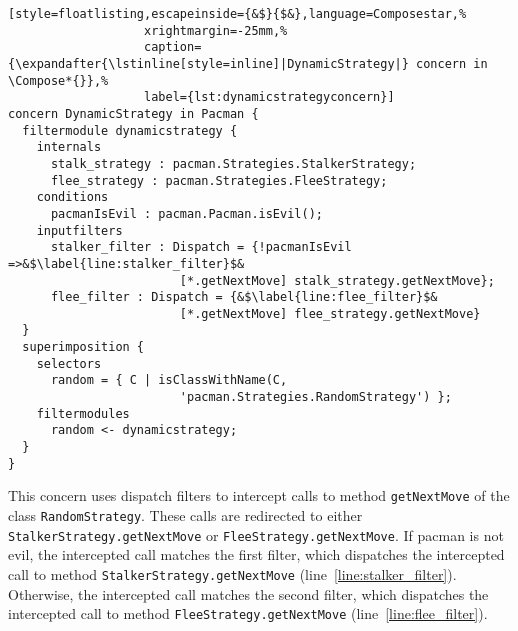 \begin{lstlisting}[style=floatlisting,escapeinside={&$}{$&},language=Composestar,%
                   xrightmargin=-25mm,%
                   caption={\expandafter{\lstinline[style=inline]|DynamicStrategy|} concern in \Compose*{}},%
                   label={lst:dynamicstrategyconcern}]
concern DynamicStrategy in Pacman {
  filtermodule dynamicstrategy {
    internals
      stalk_strategy : pacman.Strategies.StalkerStrategy;
      flee_strategy : pacman.Strategies.FleeStrategy;   
    conditions
      pacmanIsEvil : pacman.Pacman.isEvil();
    inputfilters
      stalker_filter : Dispatch = {!pacmanIsEvil =>&$\label{line:stalker_filter}$&
                        [*.getNextMove] stalk_strategy.getNextMove};
      flee_filter : Dispatch = {&$\label{line:flee_filter}$&
                        [*.getNextMove] flee_strategy.getNextMove}
  }
  superimposition {
    selectors
      random = { C | isClassWithName(C,
                        'pacman.Strategies.RandomStrategy') };
    filtermodules
      random <- dynamicstrategy;
  }
}
\end{lstlisting}

This concern uses dispatch filters to intercept calls to method \lstinline|getNextMove| of the class \lstinline|RandomStrategy|.
These calls are redirected to either \lstinline|StalkerStrategy.getNextMove| or \lstinline|FleeStrategy.getNextMove|.
If pacman is not evil, the intercepted call matches the first filter, which dispatches the intercepted call to method \lstinline|StalkerStrategy.getNextMove| (line~\ref{line:stalker_filter}).
Otherwise, the intercepted call matches the second filter, which dispatches the intercepted call to method \lstinline|FleeStrategy.getNextMove| (line~\ref{line:flee_filter}).

